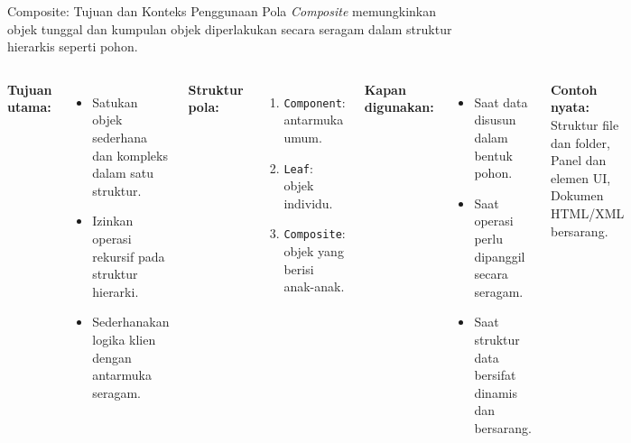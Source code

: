 \documentclass[aspectratio=169, table]{beamer}
\begin{document}
\begin{frame}[fragile]{Composite: Tujuan dan Konteks Penggunaan}
	\vspace{20pt}
	Pola \textit{Composite} memungkinkan objek tunggal dan kumpulan objek diperlakukan secara seragam dalam struktur hierarkis seperti pohon.

	\begin{columns}[T]
		\textbf{Tujuan utama:}
		\begin{itemize}
			\item Satukan objek sederhana dan kompleks dalam satu struktur.
			\item Izinkan operasi rekursif pada struktur hierarki.
			\item Sederhanakan logika klien dengan antarmuka seragam.
		\end{itemize}
		
		\textbf{Struktur pola:}
		\begin{enumerate}
			\item \texttt{Component}: antarmuka umum.
			\item \texttt{Leaf}: objek individu.
			\item \texttt{Composite}: objek yang berisi anak-anak.
		\end{enumerate}
		
		\textbf{Kapan digunakan:}
		\begin{itemize}
			\item Saat data disusun dalam bentuk pohon.
			\item Saat operasi perlu dipanggil secara seragam.
			\item Saat struktur data bersifat dinamis dan bersarang.
		\end{itemize}
		
		\textbf{Contoh nyata:} Struktur file dan folder, Panel dan elemen UI, Dokumen HTML/XML bersarang.
	\end{columns}
\end{frame}
\end{document}
